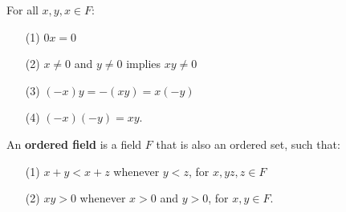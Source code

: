\begin{proposition}\label{1.2.3}
    For all $x,y,x \in F$:
        \begin{enumerate}
            \item[(1)] $0x=0$

            \item[(2)] $x \neq 0$ and $y \neq 0$ implies $xy \neq 0$

            \item[(3)] $(-x)y=-(xy)=x(-y)$

            \item[(4)] $(-x)(-y)=xy$.
        \end{enumerate}
\end{proposition}

\begin{definition}
    An \textbf{ordered field} is a field $F$ that is also an ordered set, such that:
        \begin{enumerate}
            \item[(1)] $x+y<x+z$ whenever $y<z$, for  $x,yz,z \in F$

            \item[(2)] $xy>0$ whenever  $x>0$ and  $y>0$, for  $x,y \in F$.
        \end{enumerate}
\end{definition}



